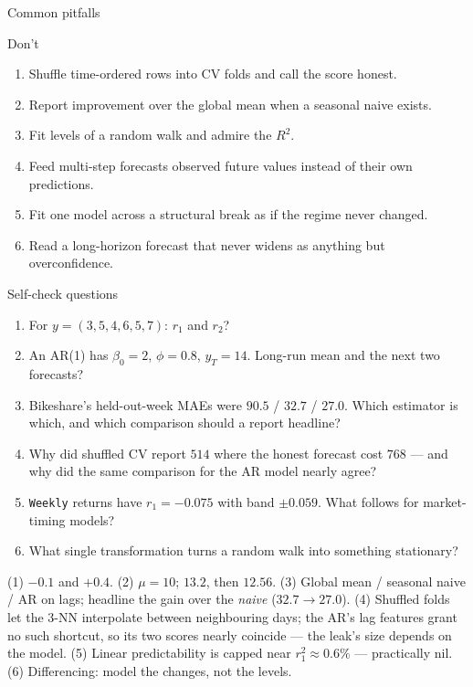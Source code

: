 \documentclass[aspectratio=169,11pt]{beamer}
\begin{document}
\begin{frame}{Common pitfalls}
  \begin{alertblock}{Don't}
    \begin{enumerate}
      \item Shuffle time-ordered rows into CV folds and call the score honest.
      \item Report improvement over the global mean when a seasonal naive exists.
      \item Fit levels of a random walk and admire the $R^2$.
      \item Feed multi-step forecasts observed future values instead of their own
            predictions.
      \item Fit one model across a structural break as if the regime never
            changed.
      \item Read a long-horizon forecast that never widens as anything but
            overconfidence.
    \end{enumerate}
  \end{alertblock}
\end{frame}

\begin{frame}{Self-check questions}
  \scriptsize
  \begin{readme}
    \begin{enumerate}
      \item For $y = (3,5,4,6,5,7)$: $r_1$ and $r_2$?
      \item An AR(1) has $\beta_0 = 2$, $\phi = 0.8$, $y_T = 14$. Long-run mean and
            the next two forecasts?
      \item Bikeshare's held-out-week MAEs were $90.5$ / $32.7$ / $27.0$. Which
            estimator is which, and which comparison should a report headline?
      \item Why did shuffled CV report $514$ where the honest forecast cost $768$
            --- and why did the same comparison for the AR model nearly agree?
      \item \texttt{Weekly} returns have $r_1 = -0.075$ with band $\pm 0.059$.
            What follows for market-timing models?
      \item What single transformation turns a random walk into something
            stationary?
    \end{enumerate}
  \end{readme}
  \begin{takeaway}[{{Answers}}]
    (1) $-0.1$ and $+0.4$. (2) $\mu = 10$; $13.2$, then $12.56$. (3) Global mean /
    seasonal naive / AR on lags; headline the gain over the \emph{naive}
    ($32.7 \to 27.0$). (4) Shuffled folds let the 3-NN interpolate between
    neighbouring days; the AR's lag features grant no such shortcut, so its two
    scores nearly coincide --- the leak's size depends on the model. (5) Linear
    predictability is capped near $r_1^2 \approx 0.6\%$ --- practically nil.
    (6) Differencing: model the changes, not the levels.
  \end{takeaway}
\end{frame}
\end{document}

